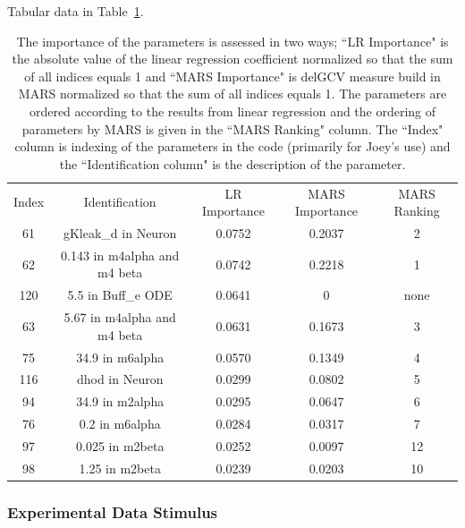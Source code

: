 \documentclass[12pt]{article}
\numberwithin{equation}{section}
\begin{document}
Tabular data in Table~\ref{qoi_K_ECS_Max_rec}.

\begin{table}[h]
\centering
\begin{tabular}{ccccc}
Index & Identification & LR Importance & MARS Importance & MARS Ranking \\

61 & gKleak\_d in Neuron & 0.0752 &  0.2037 & 2\\
62 & 0.143 in m4alpha and m4 beta & 0.0742 & 0.2218 & 1\\
120 & 5.5 in Buff\_e ODE & 0.0641 & 0 & none\\
63 &   5.67 in m4alpha and m4 beta & 0.0631 & 0.1673 & 3\\
75 & 34.9 in m6alpha & 0.0570 & 0.1349 & 4\\
116 & dhod in Neuron & 0.0299 & 0.0802 & 5\\
94 & 34.9 in m2alpha & 0.0295 & 0.0647 & 6\\
76 & 0.2 in m6alpha & 0.0284 & 0.0317 &7\\
97 & 0.025 in m2beta & 0.0252 & 0.0097 & 12\\
98 & 1.25 in m2beta & 0.0239 & 0.0203 & 10\\
\end{tabular}
\caption{The importance of the parameters is assessed in two ways; ``LR Importance" is the absolute value of the linear regression coefficient normalized so that the sum of all indices equals 1 and ``MARS Importance" is delGCV measure build in MARS normalized so that the sum of all indices equals 1. The parameters are ordered according to the results from linear regression and the ordering of parameters by MARS is given in the ``MARS Ranking" column. The ``Index" column is indexing of the parameters in the code (primarily for Joey's use) and the ``Identification column" is the description of the parameter.}
\label{qoi_K_ECS_Max_rec}
\end{table}

\newpage

\subsubsection{Experimental Data Stimulus}
\end{document}
